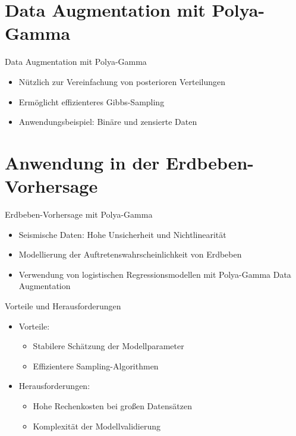 \documentclass{beamer}
\begin{document}
\section{Data Augmentation mit Polya-Gamma}
\begin{frame}{Data Augmentation mit Polya-Gamma}
  \begin{itemize}
    \item Nützlich zur Vereinfachung von posterioren Verteilungen
    \item Ermöglicht effizienteres Gibbs-Sampling
    \item Anwendungsbeispiel: Binäre und zensierte Daten
  \end{itemize}
\end{frame}

\section{Anwendung in der Erdbeben-Vorhersage}
\begin{frame}{Erdbeben-Vorhersage mit Polya-Gamma}
  \begin{itemize}
    \item Seismische Daten: Hohe Unsicherheit und Nichtlinearität
    \item Modellierung der Auftretenswahrscheinlichkeit von Erdbeben
    \item Verwendung von logistischen Regressionsmodellen mit Polya-Gamma Data Augmentation
  \end{itemize}
\end{frame}

\begin{frame}{Vorteile und Herausforderungen}
  \begin{itemize}
    \item Vorteile:
    \begin{itemize}
      \item Stabilere Schätzung der Modellparameter
      \item Effizientere Sampling-Algorithmen
    \end{itemize}
    \item Herausforderungen:
    \begin{itemize}
      \item Hohe Rechenkosten bei großen Datensätzen
      \item Komplexität der Modellvalidierung
    \end{itemize}
  \end{itemize}
\end{frame}
\end{document}
